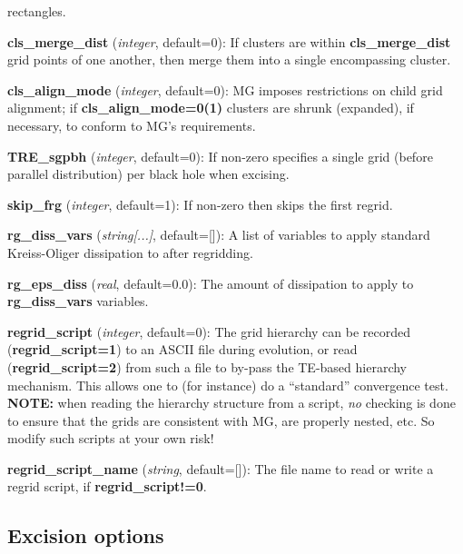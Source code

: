 \documentclass[aps,amssymb,unsortedaddress,nofootinbib]{revtex4}
\def\lsep{\itemsep 0.05in}
\begin{document}
\begin{list}{}{\lsep}
      rectangles.
\item {\bf cls\_merge\_dist} ({\em integer}, default=0): If clusters are 
      within {\bf cls\_merge\_dist} grid points of one another, then
      merge them into a single encompassing cluster.
\item {\bf cls\_align\_mode} ({\em integer}, default=0): MG imposes restrictions
      on child grid alignment; if {\bf cls\_align\_mode=0(1)} clusters are shrunk (expanded),
      if necessary, to conform to MG's requirements.
\item {\bf TRE\_sgpbh} ({\em integer}, default=0): If non-zero specifies a single
      grid (before parallel distribution) per black hole when excising.
\item {\bf skip\_frg} ({\em integer}, default=1): If non-zero then skips the first regrid.
\item {\bf rg\_diss\_vars} ({\em string[...]}, default=[]):
      A list of variables to apply standard Kreiss-Oliger dissipation to after regridding.
\item {\bf rg\_eps\_diss} ({\em real}, default=0.0):
      The amount of dissipation to apply to {\bf rg\_diss\_vars} variables.
\item {\bf regrid\_script} ({\em integer}, default=0): The grid hierarchy can 
      be recorded ({\bf regrid\_script=1}) to an ASCII file during evolution, 
      or read ({\bf regrid\_script=2}) from such a file to by-pass the TE-based 
      hierarchy mechanism. This allows one to (for instance) do a ``standard'' convergence test.
      {\bf NOTE:} when reading the hierarchy structure from a script, {\em no} checking
      is done to ensure that the grids are consistent with MG, are properly nested, etc.
      So modify such scripts at your own risk!
\item {\bf regrid\_script\_name} ({\em string}, default=[]):
      The file name to read or write a regrid script, if {\bf regrid\_script!=0}.
\end{list}

\subsection{Excision options}\label{sec_ex_ops}
\end{document}
